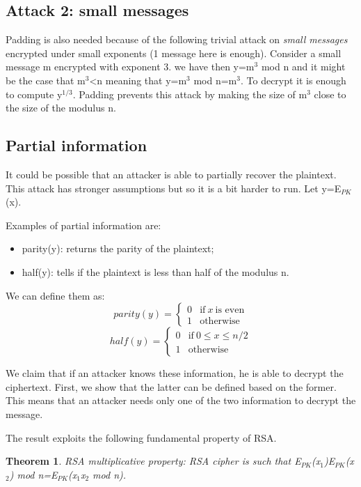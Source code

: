 \documentclass[a4paper, 12pt]{report}
\newtheorem{theorem}{\textbf{Theorem}}
\begin{document}
\subsection*{Attack 2: small messages}
Padding is also needed because of the following trivial attack on \textit{small messages} encrypted under small exponents (1 message here is enough). Consider a small message m encrypted with exponent 3. we have then y=m$^3$ mod n and it might be the case that m$^3$<n meaning that y=m$^3$ mod n=m$^3$. To decrypt it is enough to compute y$^{1/3}$. Padding prevents this attack by making the size of m$^3$ close to the size of the modulus n.

\subsection*{Partial information}
It could be possible that an attacker is able to partially recover the plaintext. This attack has stronger assumptions but so it is a bit harder to run. Let y=E$_{PK}$(x).

Examples of partial information are:
\begin{itemize}
	\item parity(y): returns the parity of the plaintext;
	\item half(y): tells if the plaintext is less than half of the modulus n.
\end{itemize}

We can define them as:
\[
parity(y)=
\begin{cases}
	0 & \text{if}\  x \ \text{is even}\\
	1 & \text{otherwise}
\end{cases}
\]
\[
half(y)=
\begin{cases}
0 & \text{if} \ 0\le x\le n/2\\
1 & \text{otherwise}
\end{cases}
\]

We claim that if an attacker knows these information, he is able to decrypt the ciphertext. First, we show that the latter can be defined based on the former. This means that an attacker needs only one of the two information to decrypt the message.

The result exploits the following fundamental property of RSA.

\begin{theorem}
	RSA multiplicative property: RSA cipher is such that E$_{PK}$(x$_1$)E$_{PK}$(x$_2$) mod n=E$_{PK}$(x$_1$x$_2$ mod n).
\end{theorem}
\end{document}
